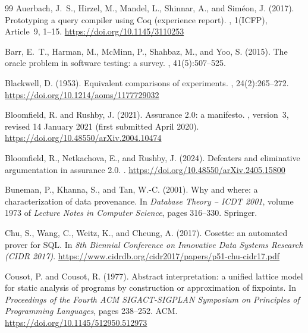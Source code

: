 \documentclass[11pt]{article}
\theoremstyle{definition}
\begin{document}
\begin{thebibliography}{99}
Auerbach, J.~S., Hirzel, M., Mandel, L., Shinnar, A., and Sim\'eon, J. (2017).
\newblock Prototyping a query compiler using Coq (experience report).
, 1(ICFP),
  Article~9, 1--15.
\newblock \url{https://doi.org/10.1145/3110253}

Barr, E.~T., Harman, M., McMinn, P., Shahbaz, M., and Yoo, S. (2015).
\newblock The oracle problem in software testing: a survey.
, 41(5):507--525.

Blackwell, D. (1953).
\newblock Equivalent comparisons of experiments.
, 24(2):265--272.
\newblock \url{https://doi.org/10.1214/aoms/1177729032}

Bloomfield, R. and Rushby, J. (2021).
\newblock Assurance 2.0: a manifesto.
, version~3, revised 14 January
  2021 (first submitted April 2020).
\newblock \url{https://doi.org/10.48550/arXiv.2004.10474}

Bloomfield, R., Netkachova, E., and Rushby, J. (2024).
\newblock Defeaters and eliminative argumentation in assurance 2.0.
.
\newblock \url{https://doi.org/10.48550/arXiv.2405.15800}

Buneman, P., Khanna, S., and Tan, W.-C. (2001).
\newblock Why and where: a characterization of data provenance.
\newblock In {\em Database Theory -- ICDT 2001}, volume 1973 of {\em Lecture Notes in Computer Science}, pages 316--330. Springer.

Chu, S., Wang, C., Weitz, K., and Cheung, A. (2017).
\newblock Cosette: an automated prover for SQL.
\newblock In {\em 8th Biennial Conference on Innovative Data Systems Research
  (CIDR 2017)}.
\newblock \url{https://www.cidrdb.org/cidr2017/papers/p51-chu-cidr17.pdf}

Cousot, P. and Cousot, R. (1977).
\newblock Abstract interpretation: a unified lattice model for static analysis
  of programs by construction or approximation of fixpoints.
\newblock In {\em Proceedings of the Fourth ACM SIGACT-SIGPLAN Symposium on
  Principles of Programming Languages}, pages 238--252. ACM.
\newblock \url{https://doi.org/10.1145/512950.512973}


\end{thebibliography}
\end{document}
